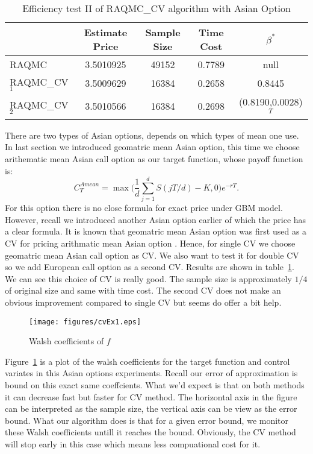 \begin{table}[h]
    \centering
	\caption{Efficiency test II of RAQMC\_CV algorithm with Asian Option}
    \label{tb:efftest2a}
    \begin{tabular}{lcccc}  
    \hline\hline
    &Estimate Price&Sample Size&Time Cost&$\beta^*$\\[0.5ex]
    \hline
    RAQMC& 3.5010925& 49152 & 0.7789 & null\\[1ex]
    RAQMC\_CV$_1$&3.5009629& 16384 & 0.2658& 0.8445 \\[1ex]
    RAQMC\_CV$_2$&3.5010566& 16384 & 0.2698&(0.8190,0.0028)$^T$\\[1ex]
    \hline
	\end{tabular}
\end{table}
There are two types of Asian options, depends on which types of mean one use. 
In last section we introduced geomatric mean Asian option, this time we choose arithematic mean Asian call option as our target function, whose payoff function is:
\[ C_{T}^{Amean} = \max\Big(\frac{1}{d}\sum_{j=1}^{d}S(jT/d)-K, 0\Big)e^{-rT}.\]
For this option there is no close formula for exact price under GBM model.
However, recall we introduced another Asian option earlier of which the price has a clear formula. 
It is known that geomatric mean Asian option was first used as a CV for pricing arithmatic mean Asian option \cite{kemna1990pricing}. 
Hence, for single CV we choose geomatric mean Asian call option as CV. 
We also want to test it for double CV so we add European call option as a second CV. 
Results are shown in table~\ref{tb:efftest2a}. We can see this choice of CV is really good. 
The sample size is approximately $1/4$ of original size and same with time cost. 
The second CV does not make an obvious improvement compared to single CV but seems do offer a bit help.    

\begin{figure}[h]
    \centering
    \texttt{[image: figures/cvEx1.eps]}
    \caption{Walsh coefficients of $f$}
    \label{fg:cvEX1}
\end{figure}

Figure~\ref{fg:cvEX1} is a plot of the walsh coefficients for the target function and control variates in this Asian options experiments. Recall our error of approximation is bound on this exact same coeffcients. 
What we'd expect is that on both methods it can decrease fast but faster for CV method.   
The horizontal axis in the figure can be interpreted as the sample size, the vertical axis can be view as the error bound. 
What our algorithm does is that for a given error bound, we monitor these Walsh coefficients untill it reaches the bound. Obviously, the CV method will stop early in this case which means less compuational cost for it. 

